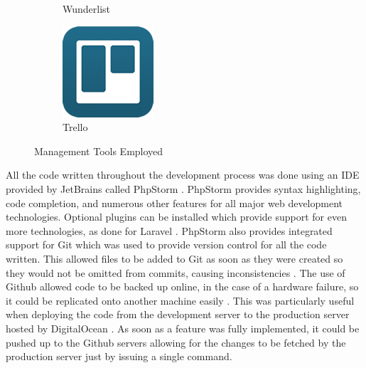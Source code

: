 \begin{figure}[H]
\begin{subfigure}[t]{0.15\linewidth}
        \caption{Wunderlist}\label{fig:Wunderlist}
    \end{subfigure}
    \quad
    \begin{subfigure}[t]{0.15\linewidth}
        \centering
        \includegraphics[width=\linewidth]{Images/Generic/Icons/Trello}
        \caption{Trello}\label{fig:Trello}
    \end{subfigure}
    \caption{Management Tools Employed}\label{fig:ManagementTools}
\end{figure}

All the code written throughout the development process was done using an IDE provided by JetBrains called PhpStorm \cite{JetBrains:PHPStorm}. PhpStorm provides syntax highlighting, code completion, and numerous other features for all major web development technologies. Optional plugins can be installed which provide support for even more technologies, as done for Laravel \cite{JetBrains:PHPStorm}. PhpStorm also provides integrated support for Git which was used to provide version control for all the code written. This allowed files to be added to Git as soon as they were created so they would not be omitted from commits, causing inconsistencies \cite{JetBrains:PHPStorm}. The use of Github allowed code to be backed up online, in the case of a hardware failure, so it could be replicated onto another machine easily \cite{Github:Home}. This was particularly useful when deploying the code from the development server to the production server hosted by DigitalOcean \cite{DigitalOcean:Home}. As soon as a feature was fully implemented, it could be pushed up to the Github servers allowing for the changes to be fetched by the production server just by issuing a single command. 


